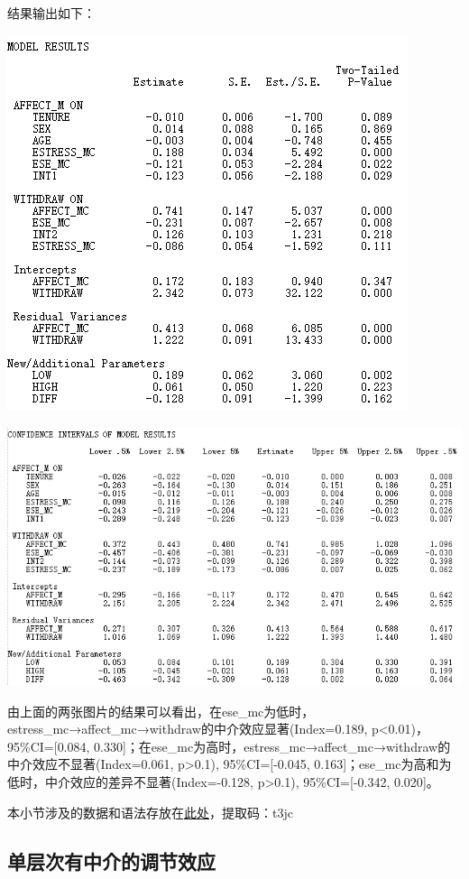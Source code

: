 \documentclass[
]{book}
\begin{document}
结果输出如下：

\includegraphics{figs/11411.png}

\includegraphics{figs/11412.png}

由上面的两张图片的结果可以看出，在ese\_mc为低时，estress\_mc→affect\_mc→withdraw的中介效应显著(Index=0.189, p\textless0.01)，95\%CI={[}0.084, 0.330{]}；在ese\_mc为高时，estress\_mc→affect\_mc→withdraw的中介效应不显著(Index=0.061, p\textgreater0.1), 95\%CI={[}-0.045, 0.163{]}；ese\_mc为高和为低时，中介效应的差异不显著(Index=-0.128, p\textgreater0.1), 95\%CI={[}-0.342, 0.020{]}。

本小节涉及的数据和语法存放在\href{https://pan.baidu.com/s/18CvdyI59eLxmkC-_8bDrcA}{此处}，提取码：t3jc

\hypertarget{memo}{%
\subsection{单层次有中介的调节效应}\label{memo}}
\end{document}

